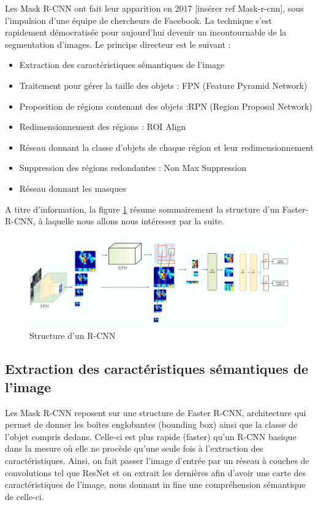 Les Mask R-CNN ont fait leur apparition en 2017 [insérer ref Mask-r-cnn], sous l'impulsion d'une équipe de chercheurs de Facebook. La technique s'est rapidement démocratisée pour aujourd'hui devenir un incontournable de la segmentation d'images. Le principe directeur est le suivant :
 \begin{itemize}
\item Extraction des caractéristiques sémantiques de l'image
\item Traitement pour gérer la taille des objets : FPN (Feature Pyramid Network)
\item Proposition de régions contenant des objets :RPN (Region Proposal Network)
\item Redimensionnement des régions : ROI Align
\item Réseau donnant la classe d'objets de chaque région et leur redimensionnement
\item Suppression des régions redondantes : Non Max Suppression
\item Réseau donnant les masques
\end{itemize}

A titre d'information, la figure \ref{R_CNN_structure} résume sommairement la structure d'un Faster-R-CNN, à laquelle nous allons nous intéresser par la suite.

\begin{figure}[!h]
\centering
\includegraphics[width=300pts]{images/Mask_R_CNN/R_CNN_structure.png} 
\caption{Structure d'un R-CNN}
\label{R_CNN_structure}
\end{figure}



\subsection{Extraction des caractéristiques sémantiques de l'image}

Les Mask R-CNN reposent sur une structure de Faster R-CNN, architecture qui permet de donner les boîtes englobantes (bounding box) ainsi que la classe de l'objet compris dedans. Celle-ci est plus rapide (faster) qu'un R-CNN basique dans la mesure où elle ne procède qu'une seule fois à l'extraction des caractéristiques. Ainsi, on fait passer l'image d'entrée par un réseau à couches de convolutions tel que ResNet et on extrait les dernières afin d'avoir une carte des caractéristiques de l'image, nous donnant in fine une compréhension sémantique de celle-ci.

